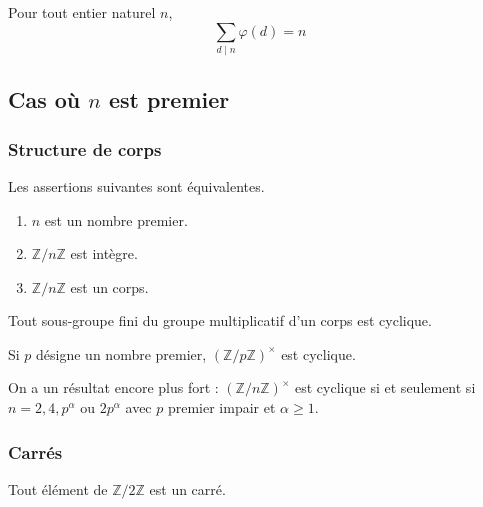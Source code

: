 	\begin{proposition}
	  Pour tout entier naturel $n$,
		\[ \sum_{d \mid n} \varphi(d) = n \]
	\end{proposition}

	\subsection{Cas où \texorpdfstring{$n$}{n} est premier}

	\subsubsection{Structure de corps}

	\begin{proposition}
		Les assertions suivantes sont équivalentes.
		\begin{enumerate}[label=(\roman*)]
			\item $n$ est un nombre premier.
			\item $\mathbb{Z}/n\mathbb{Z}$ est intègre.
			\item $\mathbb{Z}/n\mathbb{Z}$ est un corps.
		\end{enumerate}
	\end{proposition}


	\begin{theorem}
		Tout sous-groupe fini du groupe multiplicatif d'un corps est cyclique.
	\end{theorem}

	\begin{corollary}
		Si $p$ désigne un nombre premier, $(\mathbb{Z}/p\mathbb{Z})^\times$ est cyclique.
	\end{corollary}


	\begin{remark}
		On a un résultat encore plus fort : $(\mathbb{Z}/n\mathbb{Z})^\times$ est cyclique si et seulement si $n = 2, 4, p^\alpha \text{ ou } 2p^\alpha$ avec $p$ premier impair et $\alpha \geq 1$.
	\end{remark}

	\subsubsection{Carrés}


	\begin{remark}
		Tout élément de $\mathbb{Z}/2\mathbb{Z}$ est un carré.
	\end{remark}

